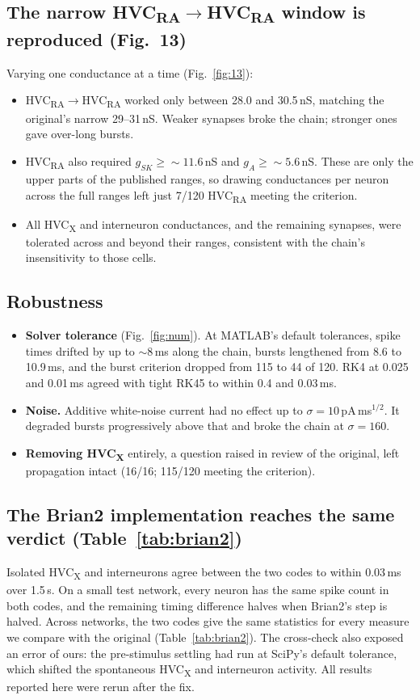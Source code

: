 \subsection*{The narrow HVC\textsubscript{RA}$\to$HVC\textsubscript{RA} window is reproduced (Fig.~13)}
Varying one conductance at a time (Fig.~\ref{fig:13}):
\begin{itemize}
\item HVC\textsubscript{RA}$\to$HVC\textsubscript{RA} worked only between 28.0 and 30.5\,nS,
  matching the original's narrow 29--31\,nS. Weaker synapses broke the chain; stronger ones gave
  over-long bursts.
\item HVC\textsubscript{RA} also required $g_{SK}\geq{\sim}11.6$\,nS and $g_A\geq{\sim}5.6$\,nS. These
  are only the upper parts of the published ranges, so drawing conductances per neuron across the
  full ranges left just 7/120 HVC\textsubscript{RA} meeting the criterion.
\item All HVC\textsubscript{X} and interneuron conductances, and the remaining synapses, were
  tolerated across and beyond their ranges, consistent with the chain's insensitivity to those
  cells.
\end{itemize}

\subsection*{Robustness}
\begin{itemize}
\item \textbf{Solver tolerance} (Fig.~\ref{fig:num}). At MATLAB's default tolerances, spike times
  drifted by up to $\sim$8\,ms along the chain, bursts lengthened from 8.6 to 10.9\,ms, and the
  burst criterion dropped from 115 to 44 of 120. RK4 at 0.025 and 0.01\,ms agreed with tight
  RK45 to within 0.4 and 0.03\,ms.
\item \textbf{Noise.} Additive white-noise current had no effect up to
  $\sigma=10$\,pA\,ms$^{1/2}$. It degraded bursts progressively above that and broke the chain
  at $\sigma=160$.
\item \textbf{Removing HVC\textsubscript{X}} entirely, a question raised in review of the
  original, left propagation intact (16/16; 115/120 meeting the criterion).
\end{itemize}

\subsection*{The Brian2 implementation reaches the same verdict (Table~\ref{tab:brian2})}
Isolated HVC\textsubscript{X} and interneurons agree between the two codes to within 0.03\,ms
over 1.5\,s. On a small test network, every neuron has the same spike count in both codes, and
the remaining timing difference halves when Brian2's step is halved. Across networks, the two
codes give the same statistics for every measure we compare with the original
(Table~\ref{tab:brian2}). The cross-check also exposed an error of ours: the pre-stimulus
settling had run at SciPy's default tolerance, which shifted the spontaneous
HVC\textsubscript{X} and interneuron activity. All results reported here were rerun after the
fix.

